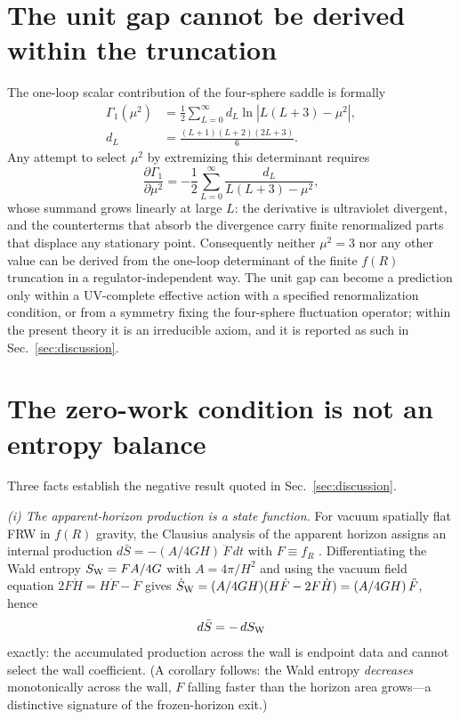 \documentclass[aps,prd,twocolumn,superscriptaddress,nofootinbib,longbibliography]{revtex4-2}
\begin{document}
\section{The unit gap cannot be derived within the truncation}
\label{app:unitgap}
The one-loop scalar contribution of the four-sphere saddle is formally
\begin{align}
\Gamma_1(\mu^2)&=\frac12\sum_{L=0}^{\infty}d_L
\ln\left|L(L+3)-\mu^2\right|,\nonumber\\
d_L&=\frac{(L+1)(L+2)(2L+3)}{6}.
\end{align}
Any attempt to select $\mu^2$ by extremizing this determinant requires
\begin{equation}
\frac{\partial\Gamma_1}{\partial\mu^2}
=-\frac12\sum_{L=0}^{\infty}\frac{d_L}{L(L+3)-\mu^2},
\end{equation}
whose summand grows linearly at large $L$: the derivative is ultraviolet
divergent, and the counterterms that absorb the divergence carry finite
renormalized parts that displace any stationary point. Consequently neither
$\mu^2=3$ nor any other value can be derived from the one-loop determinant
of the finite $f(R)$ truncation in a regulator-independent way. The unit gap
can become a prediction only within a UV-complete effective action with a
specified renormalization condition, or from a symmetry fixing the
four-sphere fluctuation operator; within the present theory it is an
irreducible axiom, and it is reported as such in Sec.~\ref{sec:discussion}.

\section{The zero-work condition is not an entropy balance}
\label{app:entropy}
Three facts establish the negative result quoted in
Sec.~\ref{sec:discussion}.

\emph{(i) The apparent-horizon production is a state function.} For vacuum
spatially flat FRW in $f(R)$ gravity, the Clausius analysis of the apparent
horizon assigns an internal production
$d\bar S=-(A/4GH)\,\ddot F\,dt$ with $F\equiv f_R$ \cite{AkbarCai2007}.
Differentiating the Wald entropy $S_{\rm W}=FA/4G$ with $A=4\pi/H^2$ and
using the vacuum field equation $2F\dot H=H\dot F-\ddot F$ gives
$\dot S_{\rm W}=(A/4GH)(H\dot F-2F\dot H)=(A/4GH)\,\ddot F$, hence
\begin{equation}
d\bar S=-\,dS_{\rm W}
\end{equation}
exactly: the accumulated production across the wall is endpoint data and
cannot select the wall coefficient. (A corollary follows: the Wald
entropy \emph{decreases} monotonically across the wall, $F$ falling faster
than the horizon area grows---a distinctive signature of the frozen-horizon
exit.)
\end{document}
